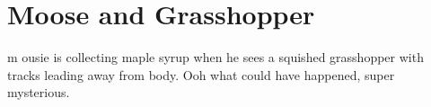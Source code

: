 \chapter{Moose and Grasshopper}
\lettrine[lines=3,loversize=-0.2,lraise=0.2]{m}{} ousie is collecting maple syrup when he sees a squished grasshopper with tracks leading away from body. Ooh what could have happened, super mysterious.
